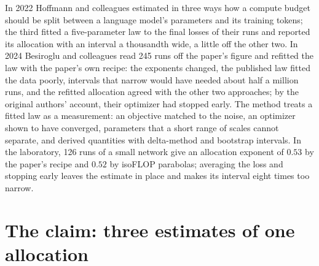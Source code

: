 \newcommand{\fittingHuber}{\operatorname{Huber}}
\newcommand{\fittingLSE}{\operatorname{LSE}}
\newcommand{\fittingNopt}{N_{\mathrm{opt}}}
\newcommand{\fittingDopt}{D_{\mathrm{opt}}}
\begin{refsection}

\begin{chaptersummary}
In 2022 Hoffmann and colleagues estimated in three ways how a compute budget should be split between a language model's parameters and its training tokens; the third fitted a five-parameter law to the final losses of their runs and reported its allocation with an interval a thousandth wide, a little off the other two. In 2024 Besiroglu and colleagues read 245 runs off the paper's figure and refitted the law with the paper's own recipe: the exponents changed, the published law fitted the data poorly, intervals that narrow would have needed about half a million runs, and the refitted allocation agreed with the other two approaches; by the original authors' account, their optimizer had stopped early. The method treats a fitted law as a measurement: an objective matched to the noise, an optimizer shown to have converged, parameters that a short range of scales cannot separate, and derived quantities with delta-method and bootstrap intervals. In the laboratory, 126 runs of a small network give an allocation exponent of $0.53$ by the paper's recipe and $0.52$ by isoFLOP parabolas; averaging the loss and stopping early leaves the estimate in place and makes its interval eight times too narrow.
\end{chaptersummary}

\section{The claim: three estimates of one allocation}\label{sec:fitting:claim}


\end{refsection}

